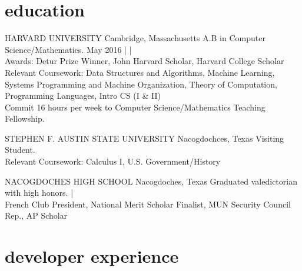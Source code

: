 \documentclass[]{friggeri-cv} %
\begin{document}

\section{education}

{HARVARD UNIVERSITY}
{Cambridge, Massachusetts}
{A.B in Computer Science/Mathematics.
May 2016 |
 |
\\
Awards: Detur Prize Winner, John Harvard Scholar, Harvard College Scholar \\
Relevant Coursework: Data Structures and Algorithms, Machine Learning, Systems Programming and Machine Organization, Theory of Computation, Programming Languages, Intro CS (I \& II)\\
Commit 16 hours per week to Computer Science/Mathematics Teaching Fellowship.\\
}
\begin{detailed}
{STEPHEN F. AUSTIN STATE UNIVERSITY}
{Nacogdochces, Texas}
{Visiting Student. \\
Relevant Coursework: Calculus I, U.S. Government/History \\
}
\end{detailed}
{NACOGDOCHES HIGH SCHOOL}
{Nacogdoches, Texas}
{Graduated valedictorian with high honors.  | \\
French Club President, National Merit Scholar Finalist, MUN Security Council Rep., AP Scholar}



\section{developer experience}
\end{document}
